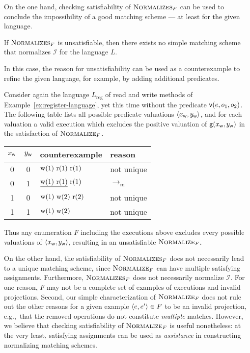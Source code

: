 On the one hand, checking satisfiability of $\textsc{Normalizes}_F$ can be used
to conclude the impossibility of a good matching scheme — at least for the
given language.

\begin{lemma}

  If $\textsc{Normalizes}_F$ is unsatisfiable, then there exists no simple
  matching scheme that normalizes $\mathcal{I}$ for the language $L$.

\end{lemma}

In this case, the reason for unsatisfiability can be used as a counterexample
to refine the given language, for example, by adding additional predicates.

\begin{example}

  Consider again the language $L_\mathrm{reg}$ of read and write methods of
  Example~\ref{ex:register-language}, yet this time without the predicate ${\sf
  v}(e,o_1,o_2)$. The following table lists all possible predicate valuations
  ${\left\langle{x_{\sf w}, y_{\sf w}}\right\rangle}$, and for each valuation a valid execution which
  excludes the positive valuation of ${\sf g}(x_{\sf w}, y_{\sf w})$ in the
  satisfaction of $\textsc{Normalize}_F$.
  \begin{center}
    \begin{tabular}{cc|ll}
      $x_{\sf w}$ & $y_{\sf w}$ & counterexample & reason \\
      \hline
      0 & 0 & ${\rm w}(1)\ {\rm r}(1)\ {\rm r}(1)$ & not unique \\
      0 & 1 & $\underline{{\rm w}(1)\ {\rm r}(1)}\ {\rm r}(1)$ & $\to_\mathrm{m}$ \\
      1 & 0 & ${\rm w}(1)\ {\rm w}(2)\ {\rm r}(2)$ & not unique \\
      1 & 1 & ${\rm w}(1)\ {\rm w}(2)$ & not unique \\
    \end{tabular}
  \end{center}
  Thus any enumeration $F$ including the executions above excludes every
  possible valuations of ${\left\langle{x_{\sf w}, y_{\sf w}}\right\rangle}$, resulting in an
  unsatisfiable $\textsc{Normalize}_F$.

\end{example}

On the other hand, the satisfiability of $\textsc{Normalizes}_F$ does not
necessarily lead to a unique matching scheme, since $\textsc{Normalize}_F$ can
have multiple satisfying assignments. Furthermore, $\textsc{Normalizes}_F$ does
not necessarily normalize $\mathcal{I}$. For one reason, $F$ may not be a
complete set of examples of executions and invalid projections. Second, our
simple characterization of $\textsc{Normalize}_F$ does not rule out the other
reasons for a given example ${\left\langle{e,e'}\right\rangle} \in F$ to be an invalid projection,
e.g.,~that the removed operations do not constitute \emph{multiple} matches.
However, we believe that checking satisfiability of $\textsc{Normalize}_F$ is
useful nonetheless: at the very least, satisfying assignments can be used as
\emph{assistance} in constructing normalizing matching schemes.
